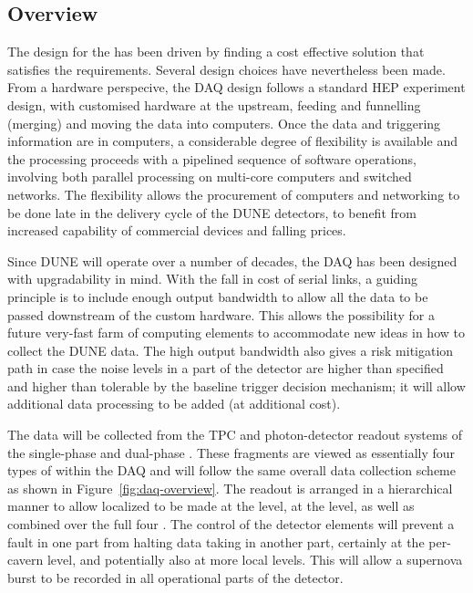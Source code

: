 \subsection{Overview}
\label{sec:fd-daq-ltr}



The design for the  has been driven by finding a cost
effective solution that satisfies the requirements. Several design
choices have nevertheless been made. 
From a hardware perspecive, the DAQ design follows a standard HEP
experiment design, with customised hardware at the upstream, feeding
and funnelling (merging) and moving the data into computers. 
Once the data and triggering information are in computers, a
considerable degree of flexibility is available and the processing
proceeds with a pipelined sequence of software operations, involving
both parallel processing on multi-core computers and switched
networks. The flexibility allows the procurement of computers and
networking to be done late in the delivery cycle of the DUNE
detectors, to benefit from increased capability of commercial devices
and falling prices.

Since DUNE will operate over a number of decades, the DAQ has been
designed with upgradability in mind.  With the fall in cost of serial
links, a guiding principle is to include enough output bandwidth to
allow all the data to be passed downstream of the custom hardware.
This allows the possibility for a future very-fast farm of computing
elements to accommodate new ideas in how to collect the DUNE data.  The
high output bandwidth also gives a risk mitigation path in case the
noise levels in a part of the detector are higher than specified and
higher than tolerable by the baseline trigger decision mechanism; it
will allow additional data processing to be added (at additional cost).


The data will be collected from the TPC and photon-detector readout
systems of the single-phase and dual-phase . 
These fragments are viewed as essentially four types of
 within the DAQ and will follow the same overall
data collection scheme as shown in Figure~\ref{fig:daq-overview}. 
The readout is arranged in a hierarchical manner to allow localized
 to be made at the  level, at the
 level, as well as combined over the full four
. 
The control of the detector elements will prevent a fault in one part
from halting data taking in another part, certainly at the per-cavern
level, and potentially also at more local levels. 
This will allow a supernova burst to be recorded in all operational
parts of the detector.

